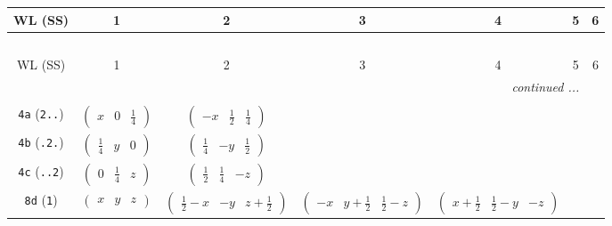 \documentclass[fleqn,9pt,landscape]{jsarticle}
\begin{document}
\begin{center}
\renewcommand{\arraystretch}{1.2}
\begin{longtable}{ccccccc}
 \hline \hline
WL (SS) & 1 & 2 & 3 & 4 & 5 & 6 \\ \hline \endfirsthead

\multicolumn{6}{l}{\tablename\ \thetable{}} \\
 \hline \hline
WL (SS) & 1 & 2 & 3 & 4 & 5 & 6 \\ \hline \endhead

 \hline \hline
\multicolumn{6}{r}{\footnotesize\it continued ...} \\ \endfoot

 \hline \hline
\multicolumn{6}{r}{} \\ \endlastfoot

{\tt 4a} ({\tt 2..}) & $ \begin{pmatrix} x & 0 & \frac{1}{4} \end{pmatrix} $ & $ \begin{pmatrix} - x & \frac{1}{2} & \frac{1}{4} \end{pmatrix} $ & $  $ & $  $ \\ \hline
{\tt 4b} ({\tt .2.}) & $ \begin{pmatrix} \frac{1}{4} & y & 0 \end{pmatrix} $ & $ \begin{pmatrix} \frac{1}{4} & - y & \frac{1}{2} \end{pmatrix} $ & $  $ & $  $ \\ \hline
{\tt 4c} ({\tt ..2}) & $ \begin{pmatrix} 0 & \frac{1}{4} & z \end{pmatrix} $ & $ \begin{pmatrix} \frac{1}{2} & \frac{1}{4} & - z \end{pmatrix} $ & $  $ & $  $ \\ \hline
{\tt 8d} ({\tt 1}) & $ \begin{pmatrix} x & y & z \end{pmatrix} $ & $ \begin{pmatrix} \frac{1}{2} - x & - y & z + \frac{1}{2} \end{pmatrix} $ & $ \begin{pmatrix} - x & y + \frac{1}{2} & \frac{1}{2} - z \end{pmatrix} $ & $ \begin{pmatrix} x + \frac{1}{2} & \frac{1}{2} - y & - z \end{pmatrix} $ \\
\end{longtable}
\end{center}
\end{document}

